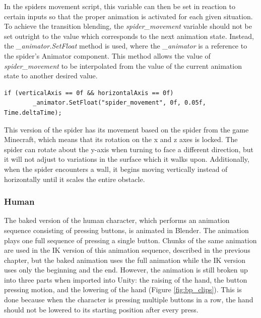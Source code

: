 In the spiders movement script, this variable can then be set in reaction to
certain inputs so that the proper animation is activated for each given situation.
To achieve the transition blending, the \textit{spider\_movement} variable
should not be set outright to the value which corresponds to the next animation
state. Instead, the \textit{\_animator.SetFloat} method is used, where the
\textit{\_animator} is a reference to the spider's Animator component. This
method allows the value of \textit{spider\_movement} to be interpolated from the value of
the current animation state to another desired value.
\newline
\begin{lstlisting}[basicstyle=\footnotesize, numbers=none,frame=single,
caption={Transitioning to the spider's idle animation using the
\textit{SetFloat} method},captionpos=b, label=stretch, language={[Sharp]c}]
    if (verticalAxis == 0f && horizontalAxis == 0f)
        _animator.SetFloat("spider_movement", 0f, 0.05f, Time.deltaTime);
\end{lstlisting}

This version of the spider has its movement based on the spider from the game
Minecraft, which means that its rotation on the x and z axes is locked. The
spider can rotate about the y-axis when turning to face a different direction,
but it will not adjust to variations in the surface which it walks upon.
Additionally, when the spider encounters a wall, it begins moving
vertically instead of horizontally until it scales the entire obstacle.

\subsubsection{Human}
The baked version of the human character, which performs an animation sequence
consisting of pressing buttons, is animated in Blender. The animation plays one
full sequence of pressing a single button. Chunks of the same animation are used
in the IK version of this animation sequence, described in the previous chapter,
but the baked animation uses the full animation while the IK version uses only
the beginning and the end. However, the animation is still broken up into three
parts when imported into Unity: the raising of the hand, the button pressing
motion, and the lowering of the hand (Figure \ref{fig:bp_clips}). This is done
because when the character is pressing multiple buttons in a row, the hand
should not be lowered to its starting position after every press.

